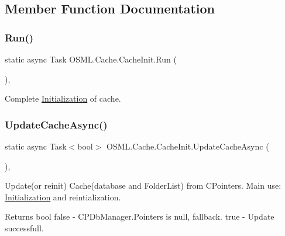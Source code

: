 \subsection{Member Function Documentation}
\mbox{\label{classOSML_1_1Cache_1_1CacheInit_a69c54afb3ce3a5c203b5721209d6e171}} 
\subsubsection{\texorpdfstring{Run()}{Run()}}
{\footnotesize\ttfamily static async Task O\+S\+M\+L.\+Cache.\+Cache\+Init.\+Run (\begin{DoxyParamCaption}{ }\end{DoxyParamCaption})\hspace{0.3cm}{\ttfamily [inline]}, {\ttfamily [static]}}



Complete \mbox{\hyperlink{classOSML_1_1Initialization}{Initialization}} of cache. 

\mbox{\label{classOSML_1_1Cache_1_1CacheInit_a56b31b12176e0eedb18e704e9f1539d5}} 
\subsubsection{\texorpdfstring{UpdateCacheAsync()}{UpdateCacheAsync()}}
{\footnotesize\ttfamily static async Task$<$bool$>$ O\+S\+M\+L.\+Cache.\+Cache\+Init.\+Update\+Cache\+Async (\begin{DoxyParamCaption}{ }\end{DoxyParamCaption})\hspace{0.3cm}{\ttfamily [inline]}, {\ttfamily [static]}}



Update(or reinit) Cache(database and Folder\+List) from C\+Pointers. Main use\+: \mbox{\hyperlink{classOSML_1_1Initialization}{Initialization}} and reintialization. 

\begin{DoxyReturn}{Returns}
bool false -\/ C\+P\+Db\+Manager.\+Pointers is null, fallback. true -\/ Update successfull. 
\end{DoxyReturn}
\mbox{\label{classOSML_1_1Cache_1_1CacheInit_a98bab831f4b3c30b6c932941d4188b28}} 
